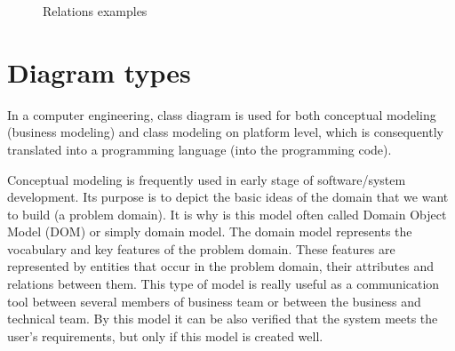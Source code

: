 \begin{figure}[!ht]
\begin{center}
\caption{Relations examples}
\label{f-relationExamples}
\end{center}
\end{figure}

\section{Diagram types}

In a computer engineering, class diagram is used for both conceptual modeling (business modeling) and class modeling on platform level, which is consequently translated into a programming language (into the programming code).

Conceptual modeling is frequently used in early stage of software/system development. Its purpose is to depict the basic ideas of the domain that we want to build (a problem domain). It is why is this model often called Domain Object Model (DOM) or simply domain model. The domain model represents the vocabulary and key features of the problem domain. These features are represented by entities that occur in the problem domain, their attributes and relations between them. This type of model is really useful as a communication tool between several members of business team or between the business and technical team. By this model it can be also verified that the system meets the user's requirements, but only if this model is created well.


